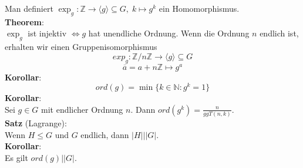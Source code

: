 \documentclass[a4paper, 12pt]{article}
\begin{document}
Man definiert $\exp_g: \mathbb{Z} \to \langle g \rangle \subseteq G, \; k \mapsto g^k$ ein Homomorphismus.\\
\textbf{Theorem}:\\
$\exp_g$ ist injektiv $\Leftrightarrow g$ hat unendliche Ordnung. Wenn die Ordnung $n$ endlich ist, erhalten wir einen Gruppenisomorphismus \[exp_g: \mathbb{Z}/ n\mathbb{Z} \to \langle g\rangle \subseteq G\]\[\overline{a} = a+n\mathbb{Z} \mapsto g^a\]
\textbf{Korollar}:
\[ord(g) = \min\{k \in \mathbb{N}: g^k = 1\}\]
\textbf{Korollar}:\\
Sei $g \in G$ mit endlicher Ordnung $n$. Dann $ord(g^k) = \frac{n}{ggT(n,k)}$.\\
\textbf{Satz} (Lagrange):\\
Wenn $H\leq G$ und $G$ endlich, dann $\left|H\right| | \left| G \right|$.\\
\textbf{Korollar}:\\
Es gilt $ord(g) | \left|G\right|$.
\end{document}
